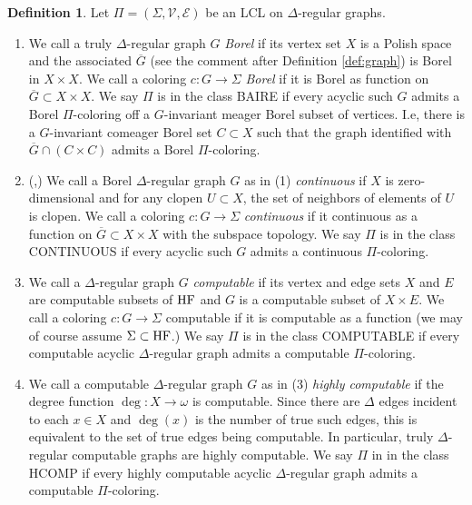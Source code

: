 \documentclass[10pt,a4paper]{amsart}
\theoremstyle{definition}
\newtheorem{definition}[theorem]{Definition}
\newcommand{\HF}{\textnormal{HF}}
\begin{document}
\begin{definition}
	Let $\Pi = (\Sigma,\mathcal{V},\mathcal{E})$ be an LCL on $\Delta$-regular graphs.
	\begin{enumerate}
		\item We call a truly $\Delta$-regular graph $G$ \textit{Borel} if its vertex set $X$ is a Polish space and the associated $\overline{G}$ (see the comment after Definition \ref{def:graph}) is Borel in $X \times X$. We call a coloring $c:G \rightarrow \Sigma$ \textit{Borel} if it is Borel as function on $\overline{G} \subset X \times X$. We say $\Pi$ is in the class BAIRE if every acyclic such $G$ admits a Borel $\Pi$-coloring off a $G$-invariant meager Borel subset of vertices. I.e, there is a $G$-invariant comeager Borel set $C \subset X$ such that the graph identified with $\overline{G} \cap (C \times C)$ admits a Borel $\Pi$-coloring.
		
		\item (\cite{bernshteyn_continuous},\cite{BCG_Trees2}) We call a Borel $\Delta$-regular graph $G$ as in (1) \textit{continuous} if $X$ is zero-dimensional and for any clopen $U \subset X$, the set of neighbors of elements of $U$ is clopen. We call a coloring $c: G \rightarrow \Sigma$ \textit{continuous} if it continuous as a function on $\overline{G} \subset X \times X$ with the subspace topology. We say $\Pi$ is in the class CONTINUOUS if every acyclic such $G$ admits a continuous $\Pi$-coloring.
		
		
		\item We call a $\Delta$-regular graph $G$ \textit{computable} if its vertex and edge sets $X$ and $E$ are computable subsets of $\HF$ and $G$ is a computable subset of $X \times E$. We call a coloring $c : G \rightarrow \Sigma$ computable if it is computable as a function (we may of course assume $\Sigma \subset \HF$.) We say $\Pi$ is in the class COMPUTABLE if every computable acyclic $\Delta$-regular graph admits a computable $\Pi$-coloring.
	
	
        \item We call a computable $\Delta$-regular graph $G$ as in (3) \textit{highly computable} if the degree function $\deg:X \rightarrow \omega$ is computable. Since there are $\Delta$ edges incident to each $x \in X$ and $\deg(x)$ is the number of true such edges, this is equivalent to the set of true edges being computable. In particular, truly $\Delta$-regular computable graphs are highly computable. We say $\Pi$ in in the class HCOMP if every highly computable acyclic $\Delta$-regular graph admits a computable $\Pi$-coloring.
    \end{enumerate}
\end{definition}
\end{document}
